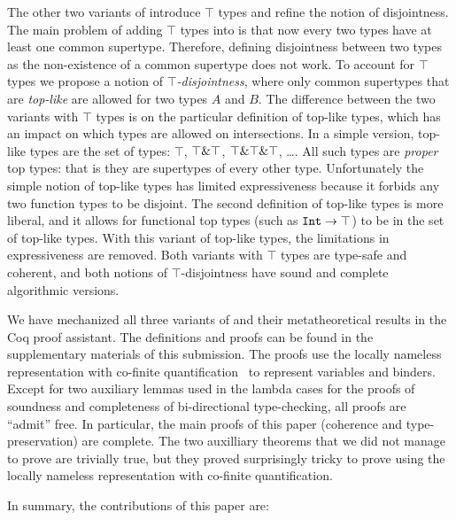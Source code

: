 The other two variants of \name introduce $\top$ types and refine the
notion of disjointness. The main problem of adding $\top$ types into
\name is that now every two types have at least one common supertype.
Therefore, defining disjointness between two types as the
non-existence of a common supertype does not work.  To account for
$\top$ types we propose a notion of \emph{$\top$-disjointness}, where
only common supertypes that are \emph{top-like} are allowed for two
types $A$ and $B$. The difference between the two variants with $\top$
types is on the particular definition of top-like types,
which has an impact on which types are allowed on intersections.
In a simple version, top-like types are the set of types: $\top$, 
$\top\&\top$, $\top\&\top\&\top$, \ldots. All such types
are \emph{proper} top types: that is they are supertypes of every
other type. Unfortunately the simple notion of top-like types 
has limited expressiveness because it forbids any two function types 
to be disjoint. The second definition of top-like types 
is more liberal, and it allows for functional top types (such as 
$\texttt{Int}\to\texttt{$\top$}$) to be in the set of top-like types. With 
this variant of top-like types, the limitations in expressiveness are
removed. Both variants with $\top$ types are type-safe and coherent, 
and both notions of $\top$-disjointness have sound and complete
algorithmic versions.

We have mechanized all three variants of \name and their
metatheoretical results in the Coq proof assistant. The definitions
and proofs can be found in the supplementary materials of this
submission. The proofs use the locally nameless representation with
co-finite quantification~\cite{aydemir-popl-08} to represent variables and
binders. Except for two auxiliary lemmas used in the lambda cases for
the proofs of soundness and completeness of bi-directional
type-checking, all proofs are ``admit'' free. In particular,
the main proofs of this paper (coherence and type-preservation) are
complete.  The two auxilliary theorems that we did not manage to prove
are trivially true, but they proved surprisingly tricky to prove using
the locally nameless representation with co-finite quantification.

In summary, the contributions of this paper are:

